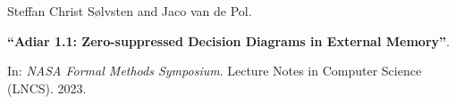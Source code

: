 Steffan Christ Sølvsten and Jaco van de Pol.

{\bf ``Adiar 1.1: Zero-suppressed Decision Diagrams in External Memory''}.

In: \emph{NASA Formal Methods Symposium}. Lecture Notes in Computer
Science (LNCS). 2023.

\label{cite:2023.nfm}